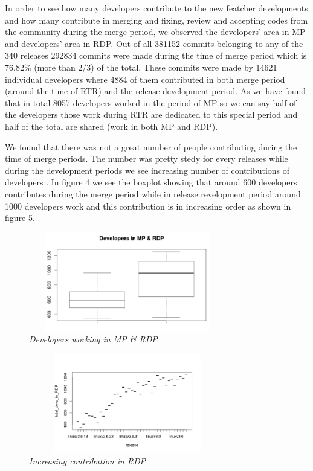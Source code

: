 \documentclass{acm_proc_article-sp}
\begin{document}
In order to see how many developers contribute to the new featcher developments and how many contribute in merging and fixing, review and accepting codes from the community during the merge period, we observed the developers' area in MP and developers' area in RDP. Out of all 381152 commits belonging to any of the 340 releases 292834 commits were made during the time of merge period which is 76.82\% (more than 2/3) of the total. These commits were made by 14621 individual developers where 4884 of them contributed in both merge period (around the time of RTR) and the release development period. As we have found that in total 8057 developers worked in the period of MP so we can say half of the developers those work during RTR are dedicated to this special period and half of the total are shared (work in both MP and RDP).

We found that there was not a great number of people contributing during the time of merge periods. The number was pretty stedy for every releases while during the development periods we see increasing number of contributions of developers . In figure 4 we see the boxplot showing that around 600 developers contributes during the merge period while in release revelopment period around 1000 developers work and this contribution is in increasing order as shown in figure 5. 

\begin{figure}
\begin{center}
\includegraphics[height=1.7in,width=3.4in]{devMPRDPBox.png}
\caption{\small \sl Developers working in MP \& RDP}
\end{center}
\end{figure}

\begin{figure}
\begin{center}
\includegraphics[height=1.7in,width=3.4in]{devRDP.png}
\caption{\small \sl Increasing contribution in RDP}
\end{center}
\end{figure}
\end{document}
